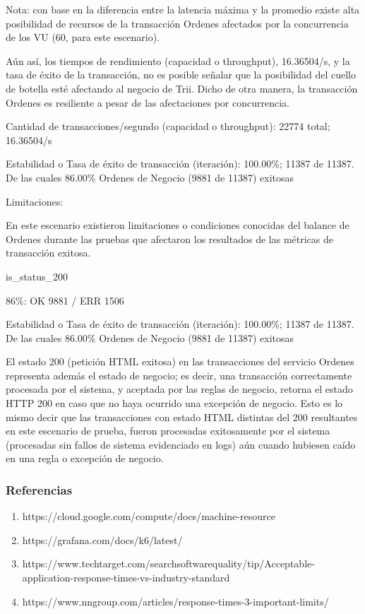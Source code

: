 \documentclass[
  paper=a4,
  ,captions=tableheading
]{scrartcl}
\providecommand{\tightlist}{%
  \setlength{\itemsep}{0pt}\setlength{\parskip}{0pt}}
\renewenvironment{quote}{\begin{customblockquote}\list{}{\rightmargin=0em\leftmargin=0em}%
\item\relax\color{blockquote-text}\ignorespaces}{\unskip\unskip\endlist\end{customblockquote}}
\begin{document}
Nota: con base en la diferencia entre la latencia máxima y la promedio
existe alta posibilidad de recursos de la transacción Ordenes afectados
por la concurrencia de los VU (60, para este escenario).

Aún así, los tiempos de rendimiento (capacidad o throughput),
16.36504/s, y la tasa de éxito de la transacción, no es posible señalar
que la posibilidad del cuello de botella esté afectando al negocio de
Trii. Dicho de otra manera, la transacción Ordenes es resiliente a pesar
de las afectaciones por concurrencia.

\begin{quote}
Cantidad de transacciones/segundo (capacidad o throughput): 22774 total;
16.36504/s

Estabilidad o Tasa de éxito de transacción (iteración): 100.00\%; 11387
de 11387. De las cuales 86.00\% Ordenes de Negocio (9881 de 11387)
exitosas
\end{quote}

Limitaciones:

En este escenario existieron limitaciones o condiciones conocidas del
balance de Ordenes durante las pruebas que afectaron los resultados de
las métricas de transacción exitosa.

\begin{quote}
is\_status\_200

86\%: OK 9881 / ERR 1506

Estabilidad o Tasa de éxito de transacción (iteración): 100.00\%; 11387
de 11387. De las cuales 86.00\% Ordenes de Negocio (9881 de 11387)
exitosas
\end{quote}

El estado 200 (petición HTML exitosa) en las transacciones del servicio
Ordenes representa además el estado de negocio; es decir, una
transacción correctamente procesada por el sistema, y aceptada por las
reglas de negocio, retorna el estado HTTP 200 en caso que no haya
ocurrido una excepción de negocio. Esto es lo mismo decir que las
transacciones con estado HTML distintas del 200 resultantes en este
escenario de prueba, fueron procesadas exitosamente por el sistema
(procesadas sin fallos de sistema evidenciado en logs) aún cuando
hubiesen caído en una regla o excepción de negocio.

\subsubsection{Referencias}\label{sec:referencias}

\begin{enumerate}
\def\labelenumi{\arabic{enumi}.}
\tightlist
\item
  https://cloud.google.com/compute/docs/machine-resource
\item
  https://grafana.com/docs/k6/latest/
\item
  https://www.techtarget.com/searchsoftwarequality/tip/Acceptable-application-response-times-vs-industry-standard
\item
  https://www.nngroup.com/articles/response-times-3-important-limits/
\end{enumerate}
\end{document}
